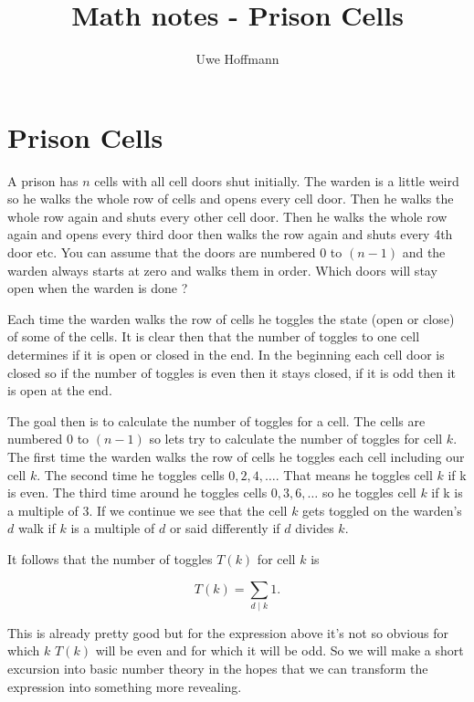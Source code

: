 

\title{Math notes - Prison Cells}
\author{Uwe Hoffmann}



\setcounter{chapter}{1}
\section*{Prison Cells}

\vspace{10 mm}
\begin{problem}
A prison has $n$ cells with all cell doors shut initially. The warden is a little weird so he walks the whole row of cells and opens every cell door. Then he walks the whole row again and shuts every other cell door. Then he walks the whole row again and opens every third door then walks the row again and shuts every 4th door etc. You can assume that the doors are numbered $0$ to $(n - 1)$ and the warden always starts at zero and walks them in order. Which doors will stay open when the warden is done ? 
\end{problem}

Each time the warden walks the row of cells he toggles the state (open or close) of some of the cells. It is clear then that the number of toggles to one cell determines if it is open or closed in the end. In the beginning each cell door is closed so if the number of toggles is even then it stays closed, if it is odd then it is open at the end.

The goal then is to calculate the number of toggles for a cell. The cells are numbered $0$ to $(n - 1)$ so lets try to calculate the number of toggles for cell $k$. The first time the warden walks the row of cells he toggles each cell including our cell $k$. The second time he toggles cells $0, 2, 4, \dots$. That means he toggles cell $k$ if k is even. The third time around he toggles cells $0, 3, 6, \dots$ so he toggles cell $k$ if k is a multiple of 3. If we continue we see that the cell $k$ gets toggled on the warden's $d$ walk if $k$ is a multiple of $d$ or said differently if $d$ divides $k$.

It follows that the number of toggles $T(k)$ for cell $k$ is

\[	 
	T(k) = \sum_{d \mid k} 1.
\]

This is already pretty good but for the expression above it's not so obvious for which $k$ $T(k)$ will be even and for which it will be odd. So we will make a short excursion into basic number theory in the hopes that we can transform the expression into something more revealing.

